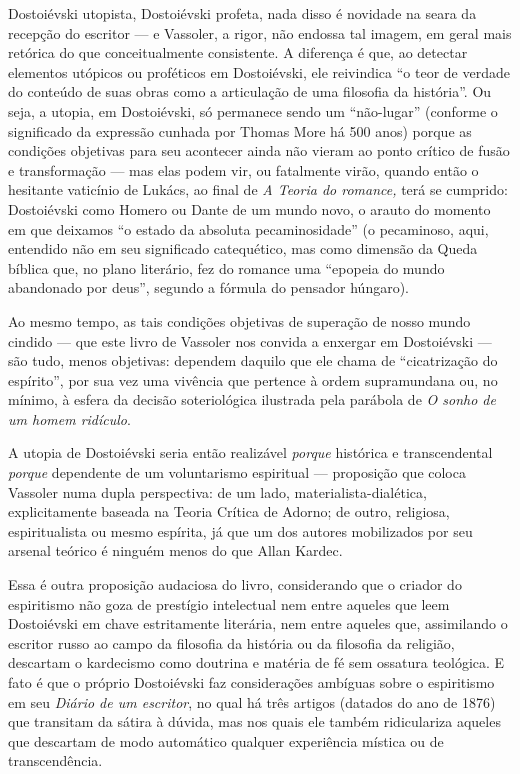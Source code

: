 Dostoiévski utopista, Dostoiévski profeta, nada disso é novidade na
seara da recepção do escritor --- e Vassoler, a rigor, não endossa tal
imagem, em geral mais retórica do que conceitualmente consistente. A
diferença é que, ao detectar elementos utópicos ou proféticos em
Dostoiévski, ele reivindica ``o teor de verdade do conteúdo de suas
obras como a articulação de uma filosofia da história''. Ou seja, a
utopia, em Dostoiévski, só permanece sendo um ``não-lugar'' (conforme o
significado da expressão cunhada por Thomas More há 500 anos) porque as
condições objetivas para seu acontecer ainda não vieram ao ponto crítico
de fusão e transformação --- mas elas podem vir, ou fatalmente virão,
quando então o hesitante vaticínio de Lukács, ao final de \emph{A Teoria
do romance,} terá se cumprido: Dostoiévski como Homero ou Dante de um
mundo novo, o arauto do momento em que deixamos ``o estado da absoluta
pecaminosidade'' (o pecaminoso, aqui, entendido não em seu significado
catequético, mas como dimensão da Queda bíblica que, no plano literário,
fez do romance uma ``epopeia do mundo abandonado por deus'', segundo a
fórmula do pensador húngaro).

Ao mesmo tempo, as tais condições objetivas de superação de nosso mundo
cindido --- que este livro de Vassoler nos convida a enxergar em
Dostoiévski --- são tudo, menos objetivas: dependem daquilo que ele chama
de ``cicatrização do espírito'', por sua vez uma vivência que pertence à
ordem supramundana ou, no mínimo, à esfera da decisão soteriológica
ilustrada pela parábola de \emph{O sonho de um homem ridículo}.

A utopia de Dostoiévski seria então realizável \emph{porque} histórica e
transcendental \emph{porque} dependente de um voluntarismo espiritual ---
proposição que coloca Vassoler numa dupla perspectiva: de um lado,
materialista-dialética, explicitamente baseada na Teoria Crítica de
Adorno; de outro, religiosa, espiritualista ou mesmo espírita, já que um
dos autores mobilizados por seu arsenal teórico é ninguém menos do que
Allan Kardec.

Essa é outra proposição audaciosa do livro, considerando que o criador
do espiritismo não goza de prestígio intelectual nem entre aqueles que
leem Dostoiévski em chave estritamente literária, nem entre aqueles que,
assimilando o escritor russo ao campo da filosofia da história ou da
filosofia da religião, descartam o kardecismo como doutrina e matéria de
fé sem ossatura teológica. E fato é que o próprio Dostoiévski faz
considerações ambíguas sobre o espiritismo em seu \emph{Diário de um
escritor}, no qual há três artigos (datados do ano de 1876) que
transitam da sátira à dúvida, mas nos quais ele também ridiculariza
aqueles que descartam de modo automático qualquer experiência mística ou
de transcendência.

